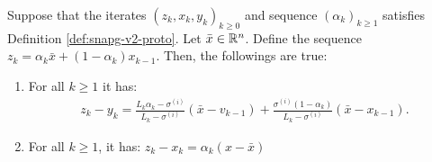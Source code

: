 \documentclass[12pt]{article}
\begin{document}
    \begin{lemma}\label{lemma:iters-snapg2-proto}
        Suppose that the iterates $(z_k, x_k, y_k)_{k \ge 0}$ and sequence $(\alpha_k)_{k \ge 1}$ satisfies Definition \ref{def:snapg-v2-proto}. 
        Let $\bar x \in \mathbb R^n$.
        Define the sequence $z_k = \alpha_k\bar x + (1 - \alpha_k)x_{k - 1}$. 
        Then, the followings are true: 
        \begin{enumerate}
            \item\label{lemma:iters-snapg2-proto-item1} For all $k \ge 1$ it has: 
            \begin{align*}
                    z_k - y_k 
                    = 
                    \frac{L_k\alpha_k - \sigma^{(i)}}{L_k - \sigma^{(i)}}(\bar x - v_{k - 1})
                    + \frac{\sigma^{(i)}(1 - \alpha_k)}{L_k - \sigma^{(i)}}(\bar x - x_{k - 1}).
            \end{align*}
            \item\label{lemma:iters-snapg2-proto-item2} For all $k \ge 1$, it has: $z_k - x_k = \alpha_k(x - \bar x)$
        \end{enumerate}
    \end{lemma}
\end{document}
